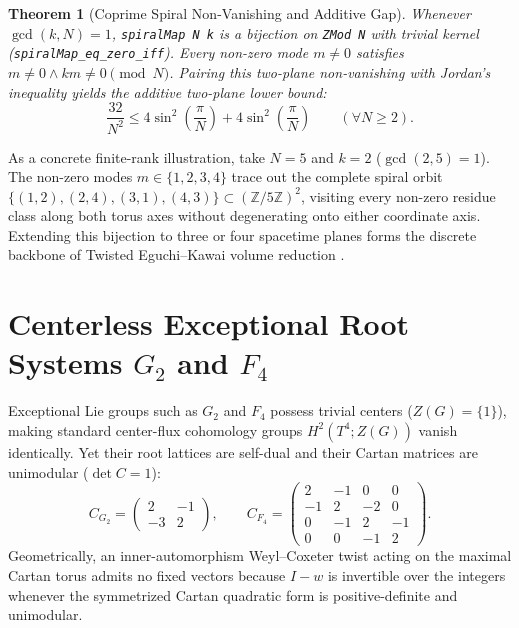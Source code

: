 \documentclass[11pt,a4paper]{article}
\newtheorem{theorem}{Theorem}[section]
\newcommand{\Z}{\mathbb{Z}}
\begin{document}
\begin{theorem}[Coprime Spiral Non-Vanishing and Additive Gap]
Whenever $\gcd(k, N) = 1$, \texttt{spiralMap N k} is a bijection on \texttt{ZMod N} with trivial kernel (\texttt{spiralMap\_\-eq\_\-zero\_\-iff}). Every non-zero mode $m \neq 0$ satisfies $m \neq 0 \land k m \neq 0 \pmod N$. Pairing this two-plane non-vanishing with Jordan's inequality yields the additive two-plane lower bound:
\begin{equation}
\frac{32}{N^2} \le 4\sin^2\left(\frac{\pi}{N}\right) + 4\sin^2\left(\frac{\pi}{N}\right) \qquad (\forall N \ge 2).
\end{equation}
\end{theorem}

As a concrete finite-rank illustration, take $N = 5$ and $k = 2$ ($\gcd(2, 5) = 1$). The non-zero modes $m \in \{1, 2, 3, 4\}$ trace out the complete spiral orbit $\{(1, 2), (2, 4), (3, 1), (4, 3)\} \subset (\Z/5\Z)^2$, visiting every non-zero residue class along both torus axes without degenerating onto either coordinate axis. Extending this bijection to three or four spacetime planes forms the discrete backbone of Twisted Eguchi--Kawai volume reduction \cite{tHooft1979}.

\section{Centerless Exceptional Root Systems $G_2$ and $F_4$}
Exceptional Lie groups such as $G_2$ and $F_4$ possess trivial centers ($Z(G) = \{1\}$), making standard center-flux cohomology groups $H^2(T^4; Z(G))$ vanish identically. Yet their root lattices are self-dual and their Cartan matrices are unimodular ($\det C = 1$):
\begin{equation}
C_{G_2} = \begin{pmatrix} 2 & -1 \\ -3 & 2 \end{pmatrix}, \qquad
C_{F_4} = \begin{pmatrix} 2 & -1 & 0 & 0 \\ -1 & 2 & -2 & 0 \\ 0 & -1 & 2 & -1 \\ 0 & 0 & -1 & 2 \end{pmatrix}.
\end{equation}
Geometrically, an inner-automorphism Weyl--Coxeter twist acting on the maximal Cartan torus admits no fixed vectors because $I - w$ is invertible over the integers whenever the symmetrized Cartan quadratic form is positive-definite and unimodular.
\end{document}
